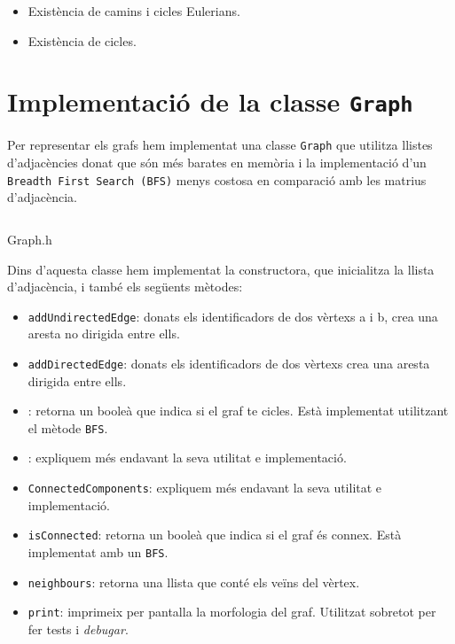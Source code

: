 \begin{itemize}
    \item Existència de camins i cicles Eulerians.
    \item Existència de cicles.
\end{itemize}



\section{Implementació de la classe \texttt{Graph}}
Per representar els grafs hem implementat una classe \texttt{Graph} que utilitza llistes d'adjacències donat que són més barates en memòria i la implementació d'un \texttt{Breadth First Search (BFS)} menys costosa en comparació amb les matrius d'adjacència.

\begin{listing}
\inputminted{cpp}{src/graph.h}
\caption{Graph.h}
\end{listing}

Dins d'aquesta classe hem implementat la constructora, que inicialitza la llista d'adjacència, i també els següents mètodes:
\begin{itemize}
    \item\texttt{addUndirectedEdge}: donats els identificadors de dos vèrtexs a i b, crea una aresta no dirigida entre ells.
    \item\texttt{addDirectedEdge}: donats els identificadors de dos vèrtexs crea una aresta dirigida entre ells.
    \item{}: retorna un booleà que indica si el graf te cicles. Està implementat utilitzant el mètode \texttt{BFS}.
    \item{}: expliquem més endavant la seva utilitat e implementació.
    \item\texttt{ConnectedComponents}: expliquem més endavant la seva utilitat e implementació.
    \item\texttt{isConnected}: retorna un booleà que indica si el graf és connex. Està implementat amb un \texttt{BFS}.
    \item\texttt{neighbours}: retorna una llista que conté els veïns del vèrtex.
    \item\texttt{print}: imprimeix per pantalla la morfologia del graf. Utilitzat sobretot per fer tests i \textit{debugar}.
\end{itemize}


